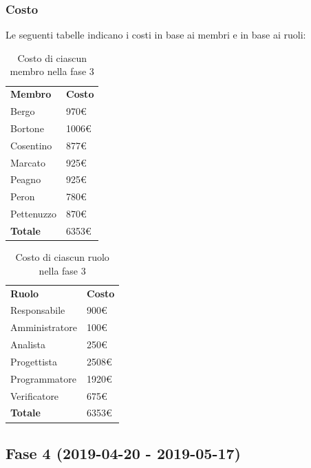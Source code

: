 	\subsubsection{Costo}
		Le seguenti tabelle indicano i costi in base ai membri e in base ai ruoli:
		\begin{table}[H]
			\centering
			\begin{tabular}{| l | l |}
				\rowcolor{LightBlue}
				\textbf{\color{white}Membro}
				& \textbf{\color{white}Costo}\\
				
				Bergo 				& 970€\\
				Bortone 			& 1006€\\
				Cosentino 		& 877€\\
				Marcato 			& 925€\\
				Peagno 			& 925€\\
				Peron 				& 780€\\
				Pettenuzzo 	& 870€\\ \hline
				\textbf{Totale} & 6353€\\ \hline
			\end{tabular}
			\caption{Costo di ciascun membro nella fase 3}
		\end{table}
		
		\begin{table}[H]
			\centering
			\begin{tabular}{| l | l |}
				\rowcolor{LightBlue}
				\textbf{\color{white}Ruolo}
				& \textbf{\color{white}Costo}\\
				
				Responsabile 		& 900€\\
				Amministratore 	& 100€\\
				Analista 				& 250€\\			
				Progettista 			& 2508€\\
				Programmatore 		& 1920€\\
				Verificatore 		& 675€\\ \hline
				\textbf{Totale} 	& 6353€\\ \hline
			\end{tabular}
			\caption{Costo di ciascun ruolo nella fase 3}
		\end{table}
		
\subsection{Fase 4 (2019-04-20 - 2019-05-17)}
